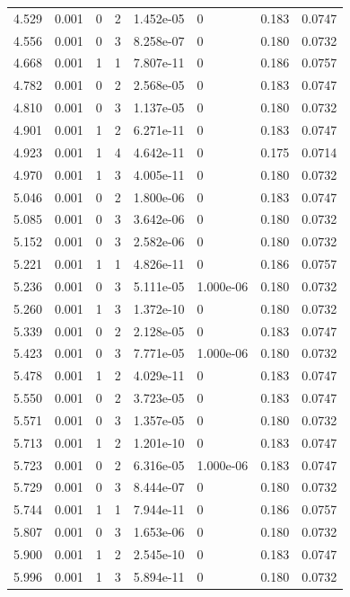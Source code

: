 \documentclass[preview]{standalone}
\begin{document}
{{{\begin{tabular}{L{1.2cm}C{1.2cm} C{0.3cm}C{0.5cm} C{1.4cm}C{1.4cm} C{1.4cm}C{1.4cm}}
  4.529  &  0.001  & 0     &  2 &  1.452e-05  & 0  & 0.183 &  0.0747   \\ 
  4.556  &  0.001  & 0     &  3 &  8.258e-07  & 0  & 0.180 &  0.0732   \\ 
  4.668  &  0.001  & 1     &  1 &  7.807e-11  & 0  & 0.186 &  0.0757   \\ 
  4.782  &  0.001  & 0     &  2 &  2.568e-05  & 0  & 0.183 &  0.0747   \\ 
  4.810  &  0.001  & 0     &  3 &  1.137e-05  & 0  & 0.180 &  0.0732   \\ 
  4.901  &  0.001  & 1     &  2 &  6.271e-11  & 0  & 0.183 &  0.0747   \\ 
  4.923  &  0.001  & 1     &  4 &  4.642e-11  & 0  & 0.175 &  0.0714   \\ 
  4.970  &  0.001  & 1     &  3 &  4.005e-11  & 0  & 0.180 &  0.0732   \\ 
  5.046  &  0.001  & 0     &  2 &  1.800e-06  & 0  & 0.183 &  0.0747   \\ 
  5.085  &  0.001  & 0     &  3 &  3.642e-06  & 0  & 0.180 &  0.0732   \\ 
  5.152  &  0.001  & 0     &  3 &  2.582e-06  & 0  & 0.180 &  0.0732   \\ 
  5.221  &  0.001  & 1     &  1 &  4.826e-11  & 0  & 0.186 &  0.0757   \\ 
  5.236  &  0.001  & 0     &  3 &  5.111e-05  & 1.000e-06  & 0.180 &  0.0732   \\ 
  5.260  &  0.001  & 1     &  3 &  1.372e-10  & 0  & 0.180 &  0.0732   \\ 
  5.339  &  0.001  & 0     &  2 &  2.128e-05  & 0  & 0.183 &  0.0747   \\ 
  5.423  &  0.001  & 0     &  3 &  7.771e-05  & 1.000e-06  & 0.180 &  0.0732   \\ 
  5.478  &  0.001  & 1     &  2 &  4.029e-11  & 0  & 0.183 &  0.0747   \\ 
  5.550  &  0.001  & 0     &  2 &  3.723e-05  & 0  & 0.183 &  0.0747   \\ 
  5.571  &  0.001  & 0     &  3 &  1.357e-05  & 0  & 0.180 &  0.0732   \\ 
  5.713  &  0.001  & 1     &  2 &  1.201e-10  & 0  & 0.183 &  0.0747   \\ 
  5.723  &  0.001  & 0     &  2 &  6.316e-05  & 1.000e-06  & 0.183 &  0.0747   \\ 
  5.729  &  0.001  & 0     &  3 &  8.444e-07  & 0  & 0.180 &  0.0732   \\ 
  5.744  &  0.001  & 1     &  1 &  7.944e-11  & 0  & 0.186 &  0.0757   \\ 
  5.807  &  0.001  & 0     &  3 &  1.653e-06  & 0  & 0.180 &  0.0732   \\ 
  5.900  &  0.001  & 1     &  2 &  2.545e-10  & 0  & 0.183 &  0.0747   \\ 
  5.996  &  0.001  & 1     &  3 &  5.894e-11  & 0  & 0.180 &  0.0732   \\ 
\hline 
\end{tabular} 

}}}
\end{document}
